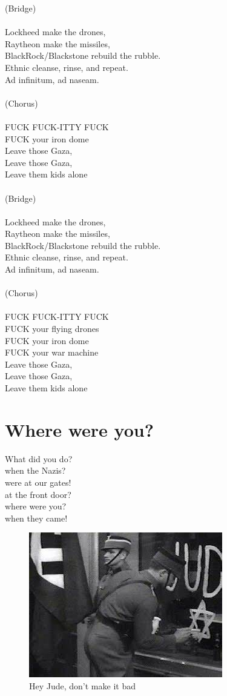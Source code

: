 \documentclass[16pt,openany,oneside]{book}
\begin{document}
(Bridge)
\\\\
Lockheed make the drones, \\ 
Raytheon make the missiles, \\ 
BlackRock/Blackstone rebuild the rubble. \\
Ethnic cleanse, rinse, and repeat. \\ 
Ad infinitum, ad naseam.
\\\\
(Chorus)
\\\\
FUCK FUCK-ITTY FUCK \\
FUCK your iron dome \\
Leave those Gaza, \\ 
Leave those Gaza, \\
Leave them kids alone
\\\\
(Bridge)
\\\\
Lockheed make the drones, \\ 
Raytheon make the missiles, \\ 
BlackRock/Blackstone rebuild the rubble. \\
Ethnic cleanse, rinse, and repeat. \\ 
Ad infinitum, ad naseam.
\\\\
(Chorus)
\\\\
FUCK FUCK-ITTY FUCK \\
FUCK your flying drones \\
FUCK your iron dome \\
FUCK your war machine \\ 
Leave those Gaza, \\ 
Leave those Gaza, \\
Leave them kids alone

\chapter{Where were you?}

What did you do? \\
when the Nazis? \\
were at our gates! \\
at the front door? \\
where were you? \\ 
when they came!

\begin{figure}[H]
    \centering
    \includegraphics[width=0.5\linewidth]{assets/jude-nazi.jpg}
    \caption{Hey Jude, don't make it bad}
    \label{fig:jude-nazi}
\end{figure}
\end{document}
